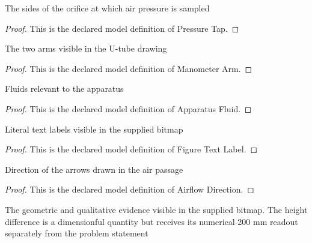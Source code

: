 \begin{definition}
  \label{def:physics:phyx-mini-0391:phyxminiproblems-problemphyxmini0391-pressuretap}
  The sides of the orifice at which air pressure is sampled
\end{definition}
\begin{proof}
  This is the declared model definition of Pressure Tap.
\end{proof}
\begin{definition}
  \label{def:physics:phyx-mini-0391:phyxminiproblems-problemphyxmini0391-manometerarm}
  The two arms visible in the U-tube drawing
\end{definition}
\begin{proof}
  This is the declared model definition of Manometer Arm.
\end{proof}
\begin{definition}
  \label{def:physics:phyx-mini-0391:phyxminiproblems-problemphyxmini0391-apparatusfluid}
  Fluids relevant to the apparatus
\end{definition}
\begin{proof}
  This is the declared model definition of Apparatus Fluid.
\end{proof}
\begin{definition}
  \label{def:physics:phyx-mini-0391:phyxminiproblems-problemphyxmini0391-figuretextlabel}
  Literal text labels visible in the supplied bitmap
\end{definition}
\begin{proof}
  This is the declared model definition of Figure Text Label.
\end{proof}
\begin{definition}
  \label{def:physics:phyx-mini-0391:phyxminiproblems-problemphyxmini0391-airflowdirection}
  Direction of the arrows drawn in the air passage
\end{definition}
\begin{proof}
  This is the declared model definition of Airflow Direction.
\end{proof}
\begin{definition}
  \label{def:physics:phyx-mini-0391:phyxminiproblems-problemphyxmini0391-orificemanometerfigure}
  The geometric and qualitative evidence visible in the supplied bitmap. The height difference is a dimensionful quantity but receives its numerical 200 mm readout separately from the problem statement
\end{definition}
